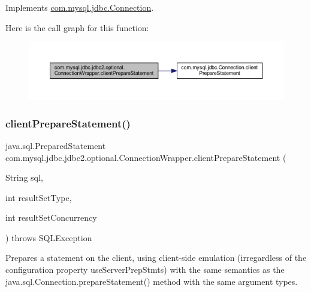 Implements \mbox{\hyperlink{interfacecom_1_1mysql_1_1jdbc_1_1_connection_a4942503d586cb18634b960ee276fa1bb}{com.\+mysql.\+jdbc.\+Connection}}.

Here is the call graph for this function\+:
\nopagebreak
\begin{figure}[H]
\begin{center}
\leavevmode
\includegraphics[width=350pt]{classcom_1_1mysql_1_1jdbc_1_1jdbc2_1_1optional_1_1_connection_wrapper_af706fcb5a89569df199c821c64b7d741_cgraph}
\end{center}
\end{figure}
\mbox{\label{classcom_1_1mysql_1_1jdbc_1_1jdbc2_1_1optional_1_1_connection_wrapper_ad71fc526adef4d300477c03514b998c2}} 
\subsubsection{\texorpdfstring{client\+Prepare\+Statement()}{clientPrepareStatement()}\hspace{0.1cm}{\footnotesize\ttfamily [3/6]}}
{\footnotesize\ttfamily java.\+sql.\+Prepared\+Statement com.\+mysql.\+jdbc.\+jdbc2.\+optional.\+Connection\+Wrapper.\+client\+Prepare\+Statement (\begin{DoxyParamCaption}\item[{String}]{sql,  }\item[{int}]{result\+Set\+Type,  }\item[{int}]{result\+Set\+Concurrency }\end{DoxyParamCaption}) throws S\+Q\+L\+Exception}

Prepares a statement on the client, using client-\/side emulation (irregardless of the configuration property \textquotesingle{}use\+Server\+Prep\+Stmts\textquotesingle{}) with the same semantics as the java.\+sql.\+Connection.\+prepare\+Statement() method with the same argument types.

